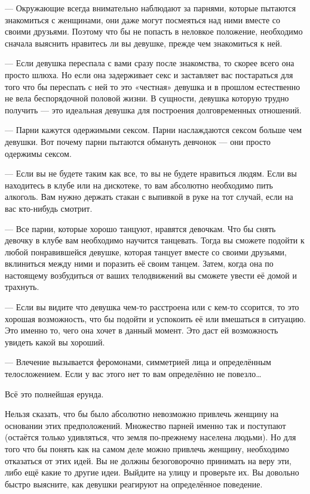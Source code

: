 --- Окружающие всегда внимательно наблюдают за парнями, которые пытаются знакомиться с женщинами, они даже могут посмеяться над ними вместе со своими друзьями. Поэтому что бы не попасть в неловкое положение, необходимо сначала выяснить нравитесь ли вы девушке, прежде чем знакомиться к ней.

--- Если девушка переспала с вами сразу после знакомства, то скорее всего она просто шлюха. Но если она задерживает секс и заставляет вас постараться для того что бы переспать с ней то это «честная» девушка и в прошлом естественно не вела беспорядочной половой жизни. В сущности, девушка которую трудно получить --- это идеальная девушка для построения долговременных отношений.

--- Парни кажутся одержимыми сексом. Парни наслаждаются сексом больше чем девушки. Вот почему парни пытаются обмануть девчонок --- они просто одержимы сексом.

--- Если вы не будете таким как все, то вы не будете нравиться людям. Если вы находитесь в клубе или на дискотеке, то вам абсолютно необходимо пить алкоголь. Вам нужно держать стакан с выпивкой в руке на тот случай, если на вас кто-нибудь смотрит.

--- Все парни, которые хорошо танцуют, нравятся девочкам. Что бы снять девочку в клубе вам необходимо научится танцевать. Тогда вы сможете подойти к любой понравившейся девушке, которая танцует вместе со своими друзьями, вклиниться между ними и поразить её своим танцем. Затем, когда она по настоящему возбудиться от ваших телодвижений вы сможете увести её домой и трахнуть.

--- Если вы видите что девушка чем-то расстроена или с кем-то ссорится, то это хорошая возможность, что бы подойти и успокоить её или вмешаться в ситуацию. Это именно то, чего она хочет в данный момент. Это даст ей возможность увидеть какой вы хороший.

--- Влечение вызывается феромонами, симметрией лица и определённым телосложением. Если у вас этого нет то вам определённо не повезло\ldots

Всё это полнейшая ерунда.

Нельзя сказать, что бы было абсолютно невозможно привлечь женщину на основании этих предположений. Множество парней именно так и поступают (остаётся только удивляться, что земля по-прежнему населена людьми). Но для того что бы понять как на самом деле можно привлечь женщину, необходимо отказаться от этих идей. Вы не должны безоговорочно принимать на веру эти, либо ещё какие то другие идеи. Выйдите на улицу и проверьте их. Вы довольно быстро выясните, как девушки реагируют на определённое поведение.

